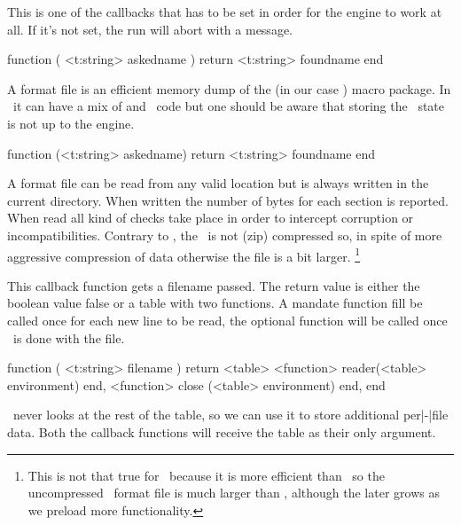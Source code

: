 \stopsection

\startsection[title=Files]

\startsubsection[title=find_log_file]

This is one of the callbacks that has to be set in order for the engine to work
at all. If it's not set, the run will abort with a message.

\starttyping[option=LUA]
function (
    <t:string> askedname
)
    return <t:string> foundname
end
\stoptyping

\stopsubsection

\startsubsection[title=find_format_file]

A format file is an efficient memory dump of the (in our case \CONTEXT) macro
package. In \LUATEX\ it can have a mix of \TEX and \LUA\ code but one should be
aware that storing the \LUA\ state is not up to the engine.

\starttyping[option=LUA]
function (<t:string> askedname)
    return <t:string> foundname
end
\stoptyping

A format file can be read from any valid location but is always written in the
current directory. When written the number of bytes for each section is reported.
When read all kind of checks take place in order to intercept corruption or
incompatibilities. Contrary to \LUATEX, the \LUAMETATEX\ is not (zip) compressed
so, in spite of more aggressive compression of data otherwise the file is a bit
larger. \footnote {This is not that true for \CONTEXT\ because it is more
efficient than \MKIV\ so the uncompressed \MKIV\ format file is much larger than
\MKXL, although the later grows as we preload more functionality.}

\stopsubsection

\startsubsection[title=open_data_file]

This callback function gets a filename passed. The return value is either the boolean
value false or a table with two functions. A mandate  function fill be
called once for each new line to be read, the optional  function will
be called once \LUATEX\ is done with the file.

\starttyping[option=LUA]
function (
    <t:string> filename
)
    return <table> {
        <function> reader(<table> environment) end,
        <function> close (<table> environment) end,
    }
end
\stoptyping

\LUAMETATEX\ never looks at the rest of the table, so we can use it to store
additional per|-|file data. Both the callback functions will receive the table as
their only argument.

